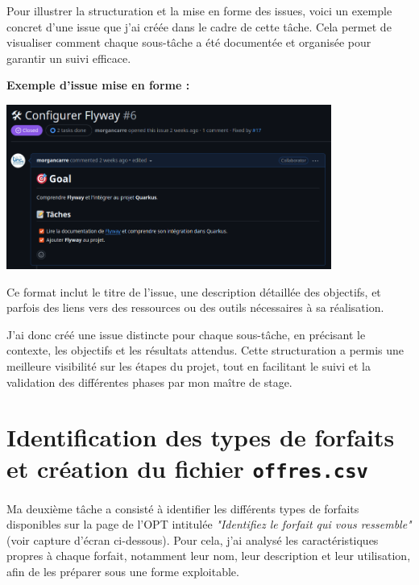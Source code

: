 \documentclass{article}
\begin{document}
	Pour illustrer la structuration et la mise en forme des issues, voici un exemple concret d’une issue que j’ai créée dans le cadre de cette tâche. Cela permet de visualiser comment chaque sous-tâche a été documentée et organisée pour garantir un suivi efficace.
	
	\begin{center}
		\textbf{Exemple d'issue mise en forme :}
	\end{center}
	
	\vspace{0.5cm}
	\begin{center}
		\includegraphics[width=0.8\textwidth]{asset/ex_issue.png}
	\end{center}
	
	Ce format inclut le titre de l’issue, une description détaillée des objectifs, et parfois des liens vers des ressources ou des outils nécessaires à sa réalisation.
	
	J’ai donc créé une issue distincte pour chaque sous-tâche, en précisant le contexte, les objectifs et les résultats attendus. Cette structuration a permis une meilleure visibilité sur les étapes du projet, tout en facilitant le suivi et la validation des différentes phases par mon maître de stage.
	\newpage
	\section{Identification des types de forfaits et création du fichier \texttt{offres.csv}}
	
	Ma deuxième tâche a consisté à identifier les différents types de forfaits disponibles sur la page de l’OPT intitulée \textit{"Identifiez le forfait qui vous ressemble"} (voir capture d’écran ci-dessous). Pour cela, j’ai analysé les caractéristiques propres à chaque forfait, notamment leur nom, leur description et leur utilisation, afin de les préparer sous une forme exploitable.
	
\end{document}
